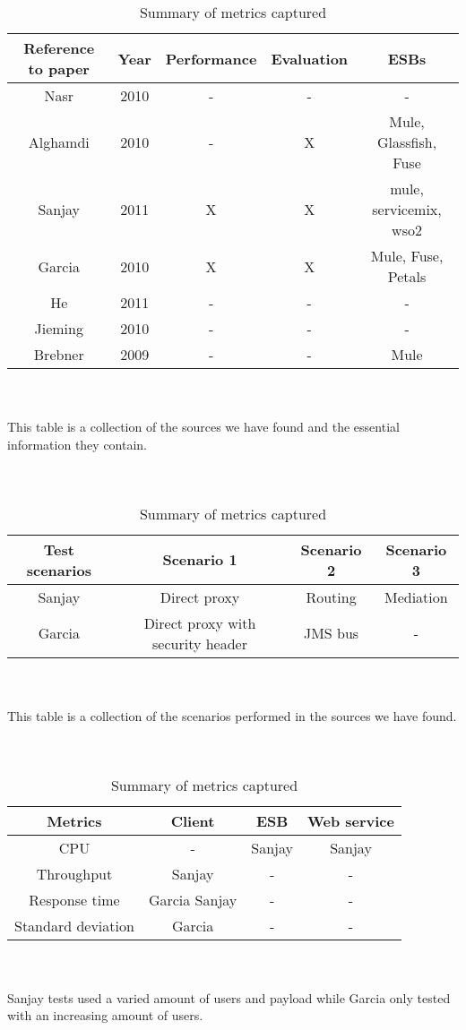 \begin{table}[H]
	\caption{Summary of academic papers and what test they perform}
	\begin{tabular}{c c c c c}

		Reference to paper & Year & Performance & Evaluation & ESBs \\ 
		\hline
		Nasr \cite{Nasr2010} & 2010 & - & - & - \\ 
		Alghamdi \cite{Alghamdi2010} & 2010 & - & X & Mule, Glassfish, Fuse\\
		Sanjay \cite{Sanjay2011} & 2011 & X & X & mule, servicemix, wso2 \\ 
		Garcia \cite{Garcia2010} & 2010 & X & X & Mule, Fuse, Petals \\
		He \cite{HeIntegration} & 2011 & - & - & -\\
		Jieming \cite{Jieming2010} & 2010 & - & - & - \\
		Brebner \cite{Brebner2009} & 2009 & - & - & Mule \\
		\hline
	\end{tabular}
	\\
	\\
	This table is a collection of the sources we have found and the essential information they contain.
	\\ 
	\\
	\\
	\caption{Summary of the scenarios in the academic performance tests}
	\begin{tabular}{c c c c}

		Test scenarios & Scenario 1 & Scenario 2 & Scenario 3 \\
		\hline
		Sanjay \cite{Sanjay2011} & Direct proxy & Routing & Mediation \\ 

		Garcia \cite{Garcia2010} & Direct proxy with security header & JMS bus & - \\ 
		\hline
	\end{tabular}
	\\
	\\
	This table is a collection of the scenarios performed in the sources we have found.
	\\
	\\
	\\
	\caption{Summary of metrics captured}
	\begin{tabular}{c c c c}
	Metrics &  Client & ESB & Web service \\
	\hline
	CPU & - & Sanjay \cite{Sanjay2011} & Sanjay \cite{Sanjay2011}\\
	Throughput & Sanjay \cite{Sanjay2011} & - & - \\
	Response time & Garcia \cite{Garcia2010} Sanjay \cite{Sanjay2011} & - & - \\
	Standard deviation & Garcia \cite{Garcia2010} & - & - \\
	\hline
	\end{tabular}
	\\
	\\
	Sanjay \cite{Sanjay2011} tests used a varied amount of users and payload while Garcia \cite{Garcia2010} only tested with an increasing amount of users.
\end{table}

